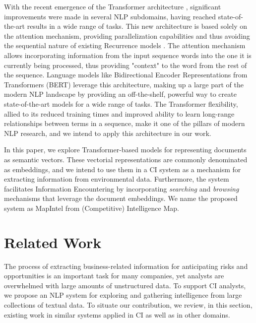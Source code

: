 \documentclass[a4paper]{article}
\begin{document}
With the recent emergence of the Transformer architecture \citep{vaswani2017}, significant improvements were made in several NLP subdomains, having reached state-of-the-art results in a wide range of tasks. This new architecture is based solely on the attention mechanism, providing parallelization capabilities and thus avoiding the sequential nature of existing Recurrence models \citep{hochreiter1997, cho2014}. The attention mechanism allows incorporating information from the input sequence words into the one it is currently being processed, thus providing "context" to the word from the rest of the sequence. Language models like Bidirectional Encoder Representations from Transformers (BERT) \citep{devlin2019} leverage this architecture, making up a large part of the modern NLP landscape by providing an off-the-shelf, powerful way to create state-of-the-art models for a wide range of tasks. The Transformer flexibility, allied to its reduced training times and improved ability to learn long-range relationships between terms in a sequence, make it one of the pillars of modern NLP research, and we intend to apply this architecture in our work.

In this paper, we explore Transformer-based models for representing documents as semantic vectors. These vectorial representations are commonly denominated as embeddings, and we intend to use them in a CI system as a mechanism for extracting information from environmental data. Furthermore, the system facilitates Information Encountering by incorporating \emph{searching} and \emph{browsing} mechanisms that leverage the document embeddings. We name the proposed system as MapIntel from (Competitive) Intelligence Map.

\section{Related Work}
The process of extracting business-related information for anticipating risks and opportunities is an important task for many companies, yet analysts are overwhelmed with large amounts of unstructured data. To support CI analysts, we propose an NLP system for exploring and gathering intelligence from large collections of textual data. To situate our contribution, we review, in this section, existing work in similar systems applied in CI as well as in other domains.
\end{document}
